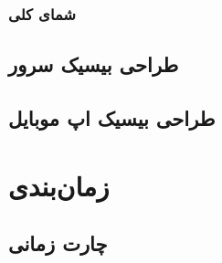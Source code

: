 \documentclass[12pt]{article}
\begin{document}
\subsubsection{شمای کلی}


\subsection{طراحی بیسیک سرور}
\subsection{طراحی بیسیک اپ موبایل}
%

\newpage
\section{زمان‌بندی} \label{gantt}

\subsection{چارت زمانی}
\end{document}
